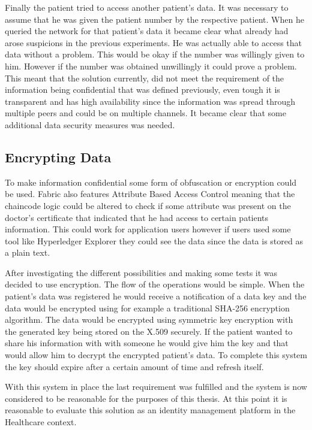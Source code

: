 Finally the patient tried to access another patient's data. It was necessary to
assume that he was given the patient number by the respective patient. When he
queried the network for that patient's data it became clear what already had
arose suspicions in the previous experiments. He was actually able to access
that data without a problem. This would be okay if the number was willingly
given to him. However if the number was obtained unwillingly it could prove a
problem. This meant that the solution currently, did not meet the requirement
of the information being confidential that was defined previously, even tough
it is transparent and has high availability since the information was spread
through multiple peers and could be on multiple channels. It became clear that
some additional data security measures was needed.

\subsection{Encrypting Data}

To make information confidential some form of obfuscation or encryption could
be used. Fabric also features Attribute Based Access Control meaning that the
chaincode logic could be altered to check if some attribute was present on the
doctor's certificate that indicated that he had access to certain patients
information. This could work for application users however if users used some
tool like Hyperledger Explorer they could see the data since the data is stored
as a plain text.

After investigating the different possibilities and making some tests it was
decided to use encryption. The flow of the operations would be simple. When the
patient's data was registered he would receive a notification of a data key and
the data would be encrypted using for example a traditional SHA-256 encryption
algorithm. The data would be encrypted using symmetric key encryption with the
generated key being stored on the X.509 securely.  If the patient wanted to
share his information with with someone he would give him the key and that
would allow him to decrypt the encrypted patient's data.  To complete this
system the key should expire after a certain amount of time and refresh itself.

With this system in place the last requirement was fulfilled and the system is
now considered to be reasonable for the purposes of this thesis. At this point
it is reasonable to evaluate this solution as an identity management platform
in the Healthcare context.

